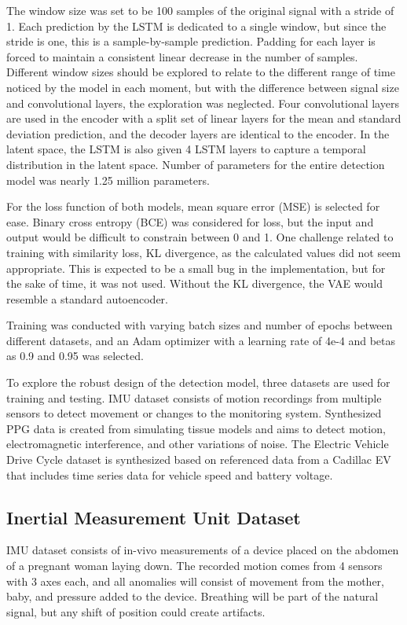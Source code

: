 \documentclass[conference]{IEEEtran}
\begin{document}
The window size was set to be 100 samples of the original signal with a stride of 1. Each prediction by the LSTM is dedicated to a single window, but since the stride is one, this is a sample-by-sample prediction. Padding for each layer is forced to maintain a consistent linear decrease in the number of samples. Different window sizes should be explored to relate to the different range of time noticed by the model in each moment, but with the difference between signal size and convolutional layers, the exploration was neglected. Four convolutional layers are used in the encoder with a split set of linear layers for the mean and standard deviation prediction, and the decoder layers are identical to the encoder. In the latent space, the LSTM is also given 4 LSTM layers to capture a temporal distribution in the latent space. Number of parameters for the entire detection model was nearly 1.25 million parameters.

For the loss function of both models, mean square error (MSE) is selected for ease. Binary cross entropy (BCE) was considered for loss, but the input and output would be difficult to constrain between 0 and 1. One challenge related to training with similarity loss, KL divergence, as the calculated values did not seem appropriate. This is expected to be a small bug in the implementation, but for the sake of time, it was not used. Without the KL divergence, the VAE would resemble a standard autoencoder.

Training was conducted with varying batch sizes and number of epochs between different datasets, and an Adam optimizer with a learning rate of 4e-4 and betas as 0.9 and 0.95 was selected. 

To explore the robust design of the detection model, three datasets are used for training and testing. IMU dataset consists of motion recordings from multiple sensors to detect movement or changes to the monitoring system. Synthesized PPG data is created from simulating tissue models and aims to detect motion, electromagnetic interference, and other variations of noise. The Electric Vehicle Drive Cycle dataset is synthesized based on referenced data from a Cadillac EV that includes time series data for vehicle speed and battery voltage.

\subsection{Inertial Measurement Unit Dataset}
IMU dataset consists of in-vivo measurements of a device placed on the abdomen of a pregnant woman laying down. The recorded motion comes from 4 sensors with 3 axes each, and all anomalies will consist of movement from the mother, baby, and pressure added to the device. Breathing will be part of the natural signal, but any shift of position could create artifacts. 
\end{document}
